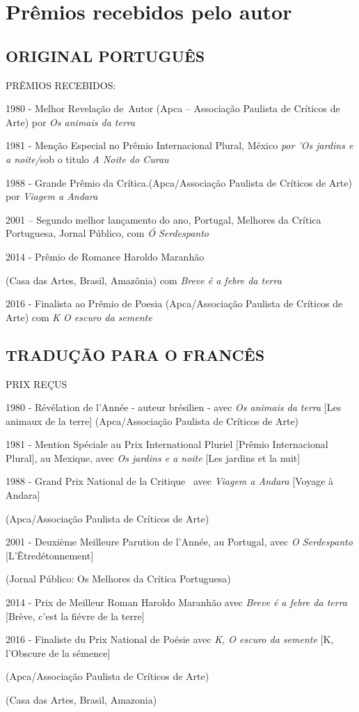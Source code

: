 \chapter*{Prêmios recebidos pelo autor}


\section{ORIGINAL PORTUGUÊS}

PRÊMIOS RECEBIDOS:

1980 - Melhor Revelação de~Autor (Apca -- Associação Paulista de
Críticos de Arte) por \emph{Os animais da terra}

1981 - Menção Especial no Prêmio Internacional Plural, México \emph{por
'Os jardins e a noite/}sob o titulo \emph{A Noite do Curau}

1988 - Grande Prêmio da Crítica.(Apca/Associação Paulista de Críticos de
Arte) por \emph{Viagem a Andara}

2001 -- Segundo melhor lançamento do ano, Portugal, Melhores da Crítica
Portuguesa, Jornal Público, com \emph{Ó Serdespanto}

2014 - Prêmio de Romance Haroldo Maranhão

(Casa das Artes, Brasil, Amazônia) com \emph{Breve é a febre da terra}

2016 - Finalista ao Prêmio de Poesia (Apca/Associação Paulista de
Críticos de Arte) com \emph{K O escuro da semente}

\section{TRADUÇÃO PARA O FRANCÊS}

PRIX REÇUS

1980 - Révélation de l'Année - auteur brésilien - avec \emph{Os animais
da terra} {[}Les animaux de la terre{]} (Apca/Associação Paulista de
Críticos de Arte)

1981 - Mention Spéciale au Prix International Pluriel {[}Prêmio
Internacional Plural{]}, au Mexique, avec \emph{Os jardins e a noite}
{[}Les jardins et la nuit{]}

1988 - Grand Prix National de la Critique~ avec \emph{Viagem a Andara}
{[}Voyage à Andara{]}

(Apca/Associação Paulista de Críticos de Arte)

2001 - Deuxième Meilleure Parution de l'Année, au Portugal, avec \emph{O
Serdespanto} {[}L'Êtredétonnement{]}

(Jornal Público: Os Melhores da Crítica Portuguesa)

2014 - Prix de Meilleur Roman Haroldo Maranhão avec \emph{Breve é a
febre da terra}~ {[}Brève, c'est la fiévre de la terre{]}

2016 - Finaliste du Prix National de Poésie avec \emph{K, O escuro da
semente} {[}K, l'Obscure de la sémence{]}

(Apca/Associação Paulista de Críticos de Arte)

(Casa das Artes, Brasil, Amazonia)
